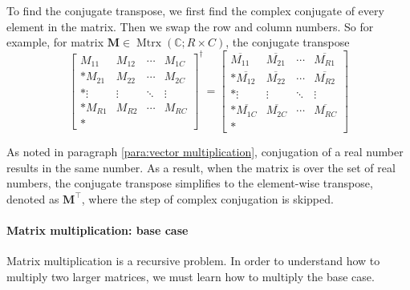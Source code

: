 \documentclass{article}
\begin{document}
To find the conjugate transpose, we first find the complex conjugate of every element in the matrix. Then we swap the row and column numbers. So for example, for matrix $\mathbf{M} \in \operatorname{Mtrx}(\mathbb{C}; R\times C)$, the conjugate transpose
\begin{equation}
    \left[
        \begin{matrix}
            M_{11} & M_{12} & \cdots & M_{1C} \\*
            M_{21} & M_{22} & \cdots & M_{2C} \\*
            \vdots & \vdots & \ddots & \vdots \\*
            M_{R1} & M_{R2} & \cdots & M_{RC} \\*
        \end{matrix}
    \right]^\dagger
    =
    \left[
        \begin{matrix}
            \overline{M_{11}} & \overline{M_{21}} & \cdots & \overline{M_{R1}}
            \\*
            \overline{M_{12}} & \overline{M_{22}} & \cdots & \overline{M_{R2}}
            \\*
            \vdots & \vdots & \ddots & \vdots
            \\*
            \overline{M_{1C}} & \overline{M_{2C}} & \cdots & \overline{M_{RC}}
            \\*
        \end{matrix}
    \right]
\end{equation}

As noted in paragraph \ref{para:vector multiplication}, conjugation of a real number results in the same number. As a result, when the matrix is over the set of real numbers, the conjugate transpose simplifies to the element-wise transpose, denoted as $\mathbf{M}^\intercal$, where the step of complex conjugation is skipped.

\paragraph{Matrix multiplication: base case}

Matrix multiplication is a recursive problem. In order to understand how to multiply two larger matrices, we must learn how to multiply the base case.
\end{document}
